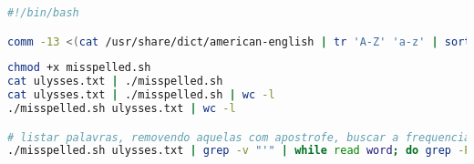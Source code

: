 \begin{frame}
\framebreak

\begin{lstlisting}[language=bash, label=lst-bash-misspelled, caption={Listando as palavras não encontradas no dicionário. Salvar no arquivo \texttt{misspelled.sh}.}, postbreak=\mbox{$\hookrightarrow$\space}, basicstyle=\fontsize{8}{10}\selectfont\ttfamily]
#!/bin/bash

comm -13 <(cat /usr/share/dict/american-english | tr 'A-Z' 'a-z' | sort | uniq) <(cat "${1:-/dev/stdin}" | tr 'A-Z' 'a-z' | tr -c "a-z'" "\n" | sed '/^$/d' | sort | uniq)
\end{lstlisting}

\framebreak

\begin{lstlisting}[language=bash, label=lst-bash-misspelled2, caption={Listando as palavras de Ulysses não encontradas no dicionário.}, postbreak=\mbox{$\hookrightarrow$\space}, basicstyle=\fontsize{8}{10}\selectfont\ttfamily]
chmod +x misspelled.sh
cat ulysses.txt | ./misspelled.sh 
cat ulysses.txt | ./misspelled.sh | wc -l
./misspelled.sh ulysses.txt | wc -l

# listar palavras, removendo aquelas com apostrofe, buscar a frequencia de ocorrencia e ordenar
./misspelled.sh ulysses.txt | grep -v "'" | while read word; do grep -P "\s$word$" wordlist.txt; done | sort -k1nr -k2
\end{lstlisting}

\framebreak

\vspace{2ex}

\vspace{2ex}

\vspace{2ex}


\end{frame}



